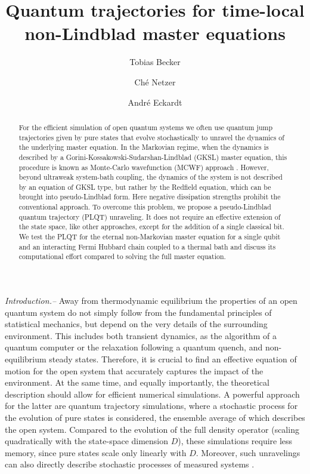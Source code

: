 \documentclass[twocolumn,prl,superscriptaddress]{revtex4-2}
\title@column\titleblock@produce
\makeatletter
\def\maketitle{
	\@author@finish
	\title@column\titleblock@produce
	\suppressfloats[t]}
\makeatother
\begin{document}
\title{Quantum trajectories for time-local non-Lindblad master equations}
\author{Tobias Becker}
\author{Ch\'{e} Netzer}
\author{Andr\'{e} Eckardt}



\begin{abstract}
For the efficient simulation of open quantum systems we often use quantum jump trajectories given by pure states that evolve stochastically to unravel the dynamics of the underlying master equation. In the Markovian regime, when the dynamics is described by a Gorini-Kossakowski-Sudarshan-Lindblad (GKSL) master equation, this procedure is known as Monte-Carlo wavefunction (MCWF) approach . However, beyond ultraweak system-bath coupling, the dynamics of the system is not described by an equation of GKSL type, but rather by the Redfield equation, which can be brought into pseudo-Lindblad form. Here negative dissipation strengths prohibit the conventional approach. To overcome this problem, we propose a pseudo-Lindblad quantum trajectory (PLQT) unraveling. It does not require an effective extension of the state space, like other approaches, except for the addition of a single classical bit. We test the PLQT for the eternal non-Markovian master equation for a single qubit and an interacting Fermi Hubbard chain coupled to a thermal bath and discuss its computational effort compared to solving the full master equation. 
\end{abstract}

\maketitle
\emph{Introduction.--} Away from thermodynamic equilibrium the properties of an open quantum system do not simply follow from the fundamental principles of statistical mechanics, but depend on the very details of the surrounding environment. 
This includes both transient dynamics, as the algorithm of a quantum computer or the relaxation following a quantum quench, and non-equilibrium steady states. Therefore, it is crucial to find an effective equation of motion for the open system that accurately captures the impact of the environment. At the same time, and equally importantly, the theoretical description should allow for efficient numerical simulations. A powerful approach for the latter are quantum trajectory simulations, where a stochastic process for the evolution of pure states is considered, the ensemble average of which describes the open system. Compared to the evolution of the full density operator (scaling quadratically with the state-space dimension $D$), these simulations require less memory, since pure states scale only linearly with $D$. Moreover, such unravelings can also directly describe stochastic processes of measured systems \cite{THBasche1995,SGleyzes2007,ZKMinev2019}. 
\end{document}
